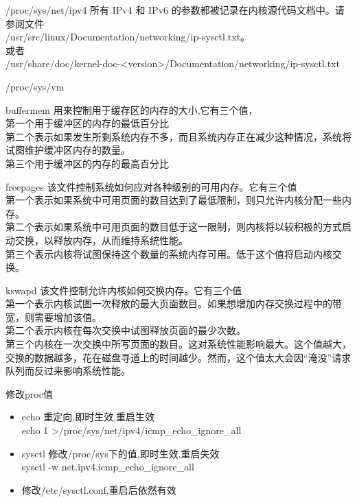 \begin{frame}{/proc/sys/net/ipv4}
所有 IPv4 和 IPv6 的参数都被记录在内核源代码文档中。请参阅文件 \\ /usr/src/linux/Documentation/networking/ip-sysctl.txt。 \\
或者 \\
/usr/share/doc/kernel-doc-<version>/Documentation/networking/ip-sysctl.txt
\end{frame}

\begin{frame}[allowframebreaks]{/proc/sys/vm}

\begin{exampleblock}{buffermem}
用来控制用于缓存区的内存的大小,它有三个值， \\
第一个用于缓冲区的内存的最低百分比 \\
第二个表示如果发生所剩系统内存不多，而且系统内存正在减少这种情况，系统将试图维护缓冲区内存的数量。 \\
第三个用于缓冲区的内存的最高百分比
\end{exampleblock}


\begin{exampleblock}{freepages}
 该文件控制系统如何应对各种级别的可用内存。它有三个值 \\
第一个表示如果系统中可用页面的数目达到了最低限制，则只允许内核分配一些内存。 \\
第二个表示如果系统中可用页面的数目低于这一限制，则内核将以较积极的方式启动交换，以释放内存，从而维持系统性能。 \\
第三个表示内核将试图保持这个数量的系统内存可用。低于这个值将启动内核交换。
\end{exampleblock}


\begin{exampleblock}{kswapd}
该文件控制允许内核如何交换内存。它有三个值\\
第一个表示内核试图一次释放的最大页面数目。如果想增加内存交换过程中的带宽，则需要增加该值。\\
第二个表示内核在每次交换中试图释放页面的最少次数。\\
第三个内核在一次交换中所写页面的数目。这对系统性能影响最大。这个值越大，交换的数据越多，花在磁盘寻道上的时间越少。然而，这个值太大会因“淹没”请求队列而反过来影响系统性能。
\end{exampleblock}
\end{frame}

\begin{frame}{修改proc值}
\begin{itemize}
\item echo 重定向,即时生效,重启生效  \\
	echo 1 >/proc/sys/net/ipv4/icmp\_echo\_ignore\_all
\item sysctl 修改/proc/sys下的值,即时生效,重启失效   \\
	sysctl -w net.ipv4.icmp\_echo\_ignore\_all
\item 修改/etc/sysctl.conf,重启后依然有效
\end{itemize}
\end{frame}


